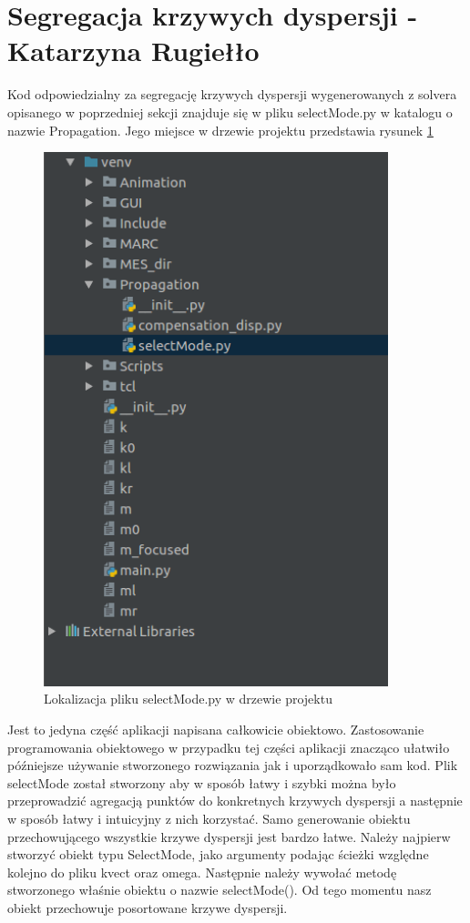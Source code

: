 \section{Segregacja krzywych dyspersji - Katarzyna Rugiełło}
Kod odpowiedzialny za segregację krzywych dyspersji wygenerowanych z solvera opisanego w poprzedniej sekcji znajduje się w pliku selectMode.py w katalogu o nazwie Propagation. Jego miejsce w drzewie projektu przedstawia rysunek \ref{fig:gdzie jest select}
\begin{figure}[h]
\centering
\includegraphics[width=10cm]{Zdjecia/5/kasia/selectMode}
\caption{Lokalizacja pliku selectMode.py w drzewie projektu}
\label{fig:gdzie jest select}
\end{figure}
Jest to jedyna część aplikacji napisana całkowicie obiektowo. Zastosowanie programowania obiektowego w przypadku tej części aplikacji znacząco ułatwiło późniejsze używanie stworzonego rozwiązania jak i uporządkowało sam kod. Plik selectMode został stworzony aby w sposób łatwy i szybki można było przeprowadzić agregacją punktów do konkretnych krzywych dyspersji a następnie w sposób łatwy i intuicyjny z nich korzystać. Samo generowanie obiektu przechowującego wszystkie krzywe dyspersji jest bardzo łatwe. Należy najpierw stworzyć obiekt typu SelectMode, jako argumenty podając ścieżki względne kolejno do pliku kvect oraz omega. Następnie należy wywołać metodę stworzonego właśnie obiektu o nazwie selectMode(). Od tego momentu nasz obiekt przechowuje posortowane krzywe dyspersji.

